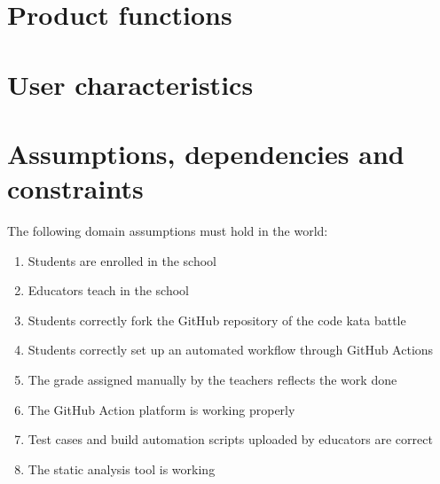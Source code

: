\section{Product functions}



\section{User characteristics}



\section{Assumptions, dependencies and constraints}
The following domain assumptions must hold in the world:

\begin{enumerate}[label=\textbf{D\arabic*}:,leftmargin=1.3cm]
	\item Students are enrolled in the school 
	\item Educators teach in the school
	\item Students correctly fork the GitHub repository of the code kata battle
	\item Students correctly set up an automated workflow through GitHub Actions
	\item The grade assigned manually by the teachers reflects the work done
	\item The GitHub Action platform is working properly
	\item Test cases and build automation scripts uploaded by educators are correct
	\item The static analysis tool is working
\end{enumerate}